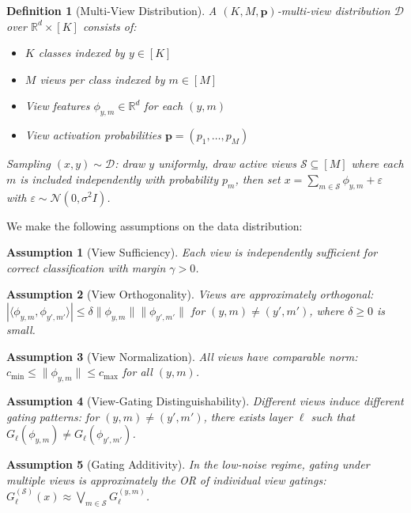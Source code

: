 \documentclass{article}
\newtheorem{definition}[theorem]{Definition}
\newtheorem{assumption}{Assumption}
\newcommand{\R}{\mathbb{R}}
\newcommand{\cD}{\mathcal{D}}
\newcommand{\cS}{\mathcal{S}}
\begin{document}
\begin{definition}[Multi-View Distribution]
A $(K, M, \mathbf{p})$-multi-view distribution $\cD$ over $\R^d \times [K]$ consists of:
\begin{itemize}
    \item $K$ classes indexed by $y \in [K]$
    \item $M$ views per class indexed by $m \in [M]$
    \item View features $\phi_{y,m} \in \R^d$ for each $(y,m)$
    \item View activation probabilities $\mathbf{p} = (p_1, \ldots, p_M)$
\end{itemize}
Sampling $(x, y) \sim \cD$: draw $y$ uniformly, draw active views $\cS \subseteq [M]$ where each $m$ is included independently with probability $p_m$, then set $x = \sum_{m \in \cS} \phi_{y,m} + \varepsilon$ with $\varepsilon \sim \mathcal{N}(0, \sigma^2 I)$.
\end{definition}

We make the following assumptions on the data distribution:

\begin{assumption}[View Sufficiency]
\label{ass:sufficiency}
Each view is independently sufficient for correct classification with margin $\gamma > 0$.
\end{assumption}

\begin{assumption}[View Orthogonality]
\label{ass:orthogonality}
Views are approximately orthogonal: $|\langle \phi_{y,m}, \phi_{y',m'} \rangle| \leq \delta \|\phi_{y,m}\| \|\phi_{y',m'}\|$ for $(y,m) \neq (y',m')$, where $\delta \geq 0$ is small.
\end{assumption}

\begin{assumption}[View Normalization]
\label{ass:normalization}
All views have comparable norm: $c_{\min} \leq \|\phi_{y,m}\| \leq c_{\max}$ for all $(y,m)$.
\end{assumption}

\begin{assumption}[View-Gating Distinguishability]
\label{ass:gating}
Different views induce different gating patterns: for $(y,m) \neq (y',m')$, there exists layer $\ell$ such that $G_\ell(\phi_{y,m}) \neq G_\ell(\phi_{y',m'})$.
\end{assumption}

\begin{assumption}[Gating Additivity]
\label{ass:additivity}
In the low-noise regime, gating under multiple views is approximately the OR of individual view gatings: $G_\ell^{(\cS)}(x) \approx \bigvee_{m \in \cS} G_\ell^{(y,m)}$.
\end{assumption}
\end{document}
